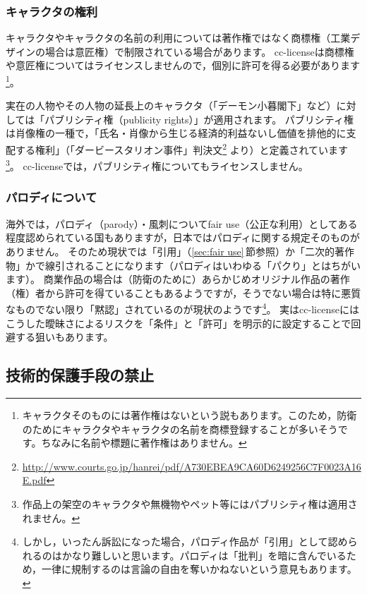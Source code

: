 \documentclass{ltjsarticle}
\begin{document}
\subsubsection{キャラクタの権利}

キャラクタやキャラクタの名前の利用については著作権ではなく商標権（工業デザインの場合は意匠権）で制限されている場合があります。
cc-licenseは商標権や意匠権についてはライセンスしませんので，個別に許可を得る必要があります\footnote{キャラクタそのものには著作権はないという説もあります。このため，防衛のためにキャラクタやキャラクタの名前を商標登録することが多いそうです。ちなみに名前や標題に著作権はありません。}。

実在の人物やその人物の延長上のキャラクタ（「デーモン小暮閣下」など）に対しては「パブリシティ権（publicity rights）」が適用されます。
パブリシティ権は肖像権の一種で，「氏名・肖像から生じる経済的利益ないし価値を排他的に支配する権利」（「ダービースタリオン事件」判決文\footnote{\url{http://www.courts.go.jp/hanrei/pdf/A730EBEA9CA60D6249256C7F0023A16E.pdf}} より）と定義されています\footnote{作品上の架空のキャラクタや無機物やペット等にはパブリシティ権は適用されません。}。
cc-licenseでは，パブリシティ権についてもライセンスしません。

\subsubsection{パロディについて}

海外では，パロディ（parody）・風刺についてfair use（公正な利用）としてある程度認められている国もありますが，日本ではパロディに関する規定そのものがありません。
そのため現状では「引用」（\ref{sec:fair use}\,節参照）か「二次的著作物」かで線引されることになります（パロディはいわゆる「パクり」とはちがいます）。
商業作品の場合は（防衛のために）あらかじめオリジナル作品の著作（権）者から許可を得ていることもあるようですが，そうでない場合は特に悪質なものでない限り「黙認」されているのが現状のようです\footnote{しかし，いったん訴訟になった場合，パロディ作品が「引用」として認められるのはかなり難しいと思います。パロディは「批判」を暗に含んでいるため，一律に規制するのは言論の自由を奪いかねないという意見もあります。}。
実はcc-licenseにはこうした曖昧さによるリスクを「条件」と「許可」を明示的に設定することで回避する狙いもあります。


\subsection{技術的保護手段の禁止} \label{sec:drm}
\end{document}

